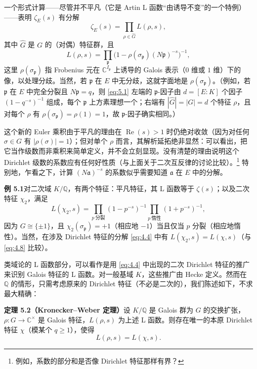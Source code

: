 一个形式计算——尽管并不平凡（它是 Artin L 函数“由诱导不变”的一个特例）——表明 $\zeta_E(s)$ 有分解
\begin{equation}\tag{5.1}\label{eq:5.1}
\zeta_E(s)=\prod_{\rho\in\widehat{G}}L(\rho,s),
\end{equation}
其中 $\widehat{G}$ 是 $G$ 的（对偶）特征群，且
\[
L(\rho,s)=\prod_{\mathfrak{p}}\bigl(1-\rho(\sigma_{\mathfrak{p}})(N\mathfrak{p})^{-s}\bigr)^{-1},
\]
这里 $\rho(\sigma_{\mathfrak{p}})$ 指 Frobenius 元在 $\mathbb{C}^{I_{\mathfrak{p}}}$ 上诱导的 Galois 表示（$0$ 维或 $1$ 维）下的像，以处理分歧。当然，若 $\mathfrak{p}$ 在 $E$ 中无分歧，这就字面地是 $\rho(\sigma_{\mathfrak{p}})$。（例如，若 $\mathfrak{p}$ 在 $E$ 中完全分裂且 $N\mathfrak{p}=q$，则 \eqref{eq:5.1} 左端的 $\mathfrak{p}$-因子由 $d=[E:K]$ 个因子 $(1-q^{-s})^{-1}$ 组成，每个 $\mathfrak{p}$ 上方素理想一个；右端有 $|\widehat{G}|=|G|=d$ 个特征 $\rho$，且对每个 $\rho$ 有 $\rho(\sigma_{\mathfrak{p}})=\rho(1)=1$，故 $\mathfrak{p}$-因子确实相同。）

这个新的 Euler 乘积由于平凡的理由在 $\operatorname{Re}(s)>1$ 时仍绝对收敛（因为对任何 $\sigma\in G$ 有 $|\rho(\sigma)|=1$）；但对单个 $\rho$ 而言，其解析延拓绝非显然：可以看出，把它当作级数而非乘积来简单定义，并不会立刻显现。没有清楚的理由说明这个 Dirichlet 级数的系数应有任何好性质（与上面关于二次互反律的讨论比较）。\footnote{例如，系数的部分和是否像 Dirichlet 特征那样有界？} 特别地，乍看之下，计算 $(N\mathfrak{a})^{-s}$ 的系数似乎需要知道 $\mathfrak{a}$ 在 $E$ 中的分解。

\par\medskip\noindent\textbf{例 5.1}\quad 对二次域 $K/\mathbb{Q}$，有两个特征：平凡特征，其 L 函数等于 $\zeta(s)$；以及二次特征 $\chi_2$，满足
\[
L(\chi_2,s)=\prod_{p\ \text{分裂}}(1-p^{-s})^{-1}
\prod_{p\ \text{惰性}}(1+p^{-s})^{-1},
\]
因为 $G\cong\{\pm1\}$，且 $\chi_2(\sigma_{\mathfrak{p}})=+1$（相应地 $-1$）当且仅当 $p$ 分裂（相应地惰性）。当然，在涉及 Dirichlet 特征的分解 \eqref{eq:4.4} 中有 $L(\chi_2,s)=L(\chi,s)$（与 \eqref{eq:4.8} 比较）。

类域论的 L 函数部分，可以看作是用 \eqref{eq:4.4} 中出现的二次 Dirichlet 特征的推广来识别 Galois 特征的 L 函数。对一般基域 $K$，这些推广由 Hecke 定义。然而在 $\mathbb{Q}$ 的情形，只需考虑原来的 Dirichlet 特征（不必是二次的），我们陈述如下，不求最大精确：

\par\medskip\noindent\textbf{定理 5.2（Kronecker--Weber 定理）}\quad 设 $K/\mathbb{Q}$ 是 Galois 群为 $G$ 的交换扩张，$\rho\colon G\to\mathbb{C}^{\times}$ 是 Galois 特征，$L(\rho,s)$ 为上述 L 函数。则存在唯一的本原 Dirichlet 特征 $\chi$（模某个 $q\ge 1$），使得
\[
L(\rho,s)=L(\chi,s).
\]

